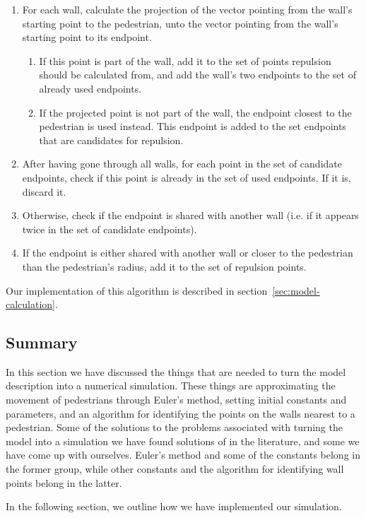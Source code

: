 \begin{enumerate}
    \item For each wall, calculate the projection of the vector pointing from 
        the wall's starting point to the pedestrian, unto the vector pointing 
        from the wall's starting point to its endpoint.
        \begin{enumerate}
            \item If this point is part of the wall, add it to the set of 
                points repulsion should be calculated from, and add the wall's 
                two endpoints to the set of already used endpoints.

            \item If the projected point is not part of the wall, the endpoint closest 
                to the pedestrian is used instead. This endpoint is added to 
                the set endpoints that are candidates for repulsion.
        \end{enumerate}

    \item After having gone through all walls, for each point in the set of 
        candidate endpoints, check if this point is already in the set of 
        used endpoints. If it is, discard it. 

    \item Otherwise, check if the endpoint is shared with another wall (i.e. 
        if it appears twice in the set of candidate endpoints).
        
    \item If the endpoint is either shared with another wall or closer to the 
        pedestrian than the pedestrian's radius, add it to the set of 
        repulsion points.
\end{enumerate}

Our implementation of this algorithm is described in 
section~\ref{sec:model-calculation}.

\subsection{Summary}
In this section we have discussed the things that are needed to turn the model 
description into a numerical simulation. These things are approximating the 
movement of pedestrians through Euler's method, setting initial constants and 
parameters, and an algorithm for identifying the points on the walls nearest 
to a pedestrian. Some of the solutions to the problems associated with turning 
the model into a simulation we have found solutions of in the literature, and 
some we have come up with ourselves. Euler's method and some of the constants 
belong in the former group, while other constants and the algorithm for 
identifying wall points belong in the latter.

In the following section, we outline how we have implemented our simulation.
